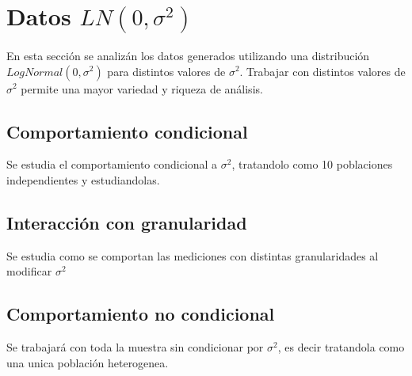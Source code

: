 \section{Datos $LN(0,\sigma^2)$}

En esta sección se analizán los datos generados utilizando una distribución $LogNormal(0,\sigma^2)$ para distintos valores de $\sigma^2$. Trabajar con distintos valores de $\sigma^2$ permite una mayor variedad y riqueza de análisis.

\subsection{Comportamiento condicional}

Se estudia el comportamiento condicional a $\sigma^2$, tratandolo como 10 poblaciones independientes y estudiandolas.

\subsection{Interacción con granularidad}

Se estudia como se comportan las mediciones con distintas granularidades al modificar $\sigma^2$

\subsection{Comportamiento no condicional}

Se trabajará con toda la muestra sin condicionar por $\sigma^2$, es decir tratandola como una unica población heterogenea.
